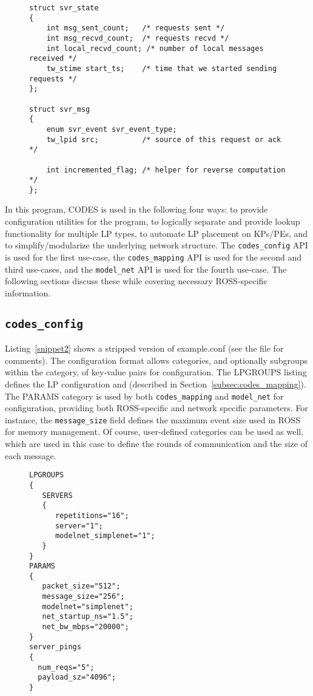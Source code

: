 \documentclass[conference,10pt,compsocconf,onecolumn]{IEEEtran}
\newcommand{\codesmapping}[1]{\texttt{codes\_mapping}}
\newcommand{\codesconfig}[1]{\texttt{codes\_config}}
\newcommand{\codesmodelnet}[1]{\texttt{model\_net}}
\begin{document}
\begin{figure}
\begin{lstlisting}[caption=Server state and event message struct, label=snippet1]
struct svr_state
{
    int msg_sent_count;   /* requests sent */
    int msg_recvd_count;  /* requests recvd */
    int local_recvd_count; /* number of local messages received */
    tw_stime start_ts;    /* time that we started sending requests */
};

struct svr_msg
{
    enum svr_event svr_event_type;
    tw_lpid src;          /* source of this request or ack */

    int incremented_flag; /* helper for reverse computation */
};

\end{lstlisting}
\end{figure}

In this program, CODES is used in the following four ways: to provide
configuration utilities for the program, to logically separate and provide
lookup functionality for multiple LP types, to automate LP placement on KPs/PEs,
and to simplify/modularize the underlying network structure. The \codesconfig{}
API is used for the first use-case, the \codesmapping{} API is used for
the second and third use-cases, and the \codesmodelnet{} API is used for the
fourth use-case. The following sections discuss these while covering necessary
ROSS-specific information.

\subsection{\codesconfig{}}

Listing~\ref{snippet2} shows a stripped version of example.conf (see the file
for comments). The configuration format allows categories, and optionally
subgroups within the category, of key-value pairs for configuration. The LPGROUPS
listing defines the LP configuration and (described in
Section~\ref{subsec:codes_mapping}). The PARAMS category is used by both
\codesmapping{} and \codesmodelnet{} for configuration, providing both ROSS-specific and
network specific parameters. For instance, the \texttt{message\_size} field defines the
maximum event size used in ROSS for memory management. Of course, user-defined
categories can be used as well, which are used in this case to define the rounds
of communication and the size of each message.

\begin{figure}
\begin{lstlisting}[caption=example configuration file for CODES LP mapping, label=snippet2]
LPGROUPS
{
   SERVERS
   {
      repetitions="16";
      server="1";
      modelnet_simplenet="1";
   }
}
PARAMS
{
   packet_size="512";
   message_size="256";
   modelnet="simplenet";
   net_startup_ns="1.5";
   net_bw_mbps="20000";
}
server_pings
{
  num_reqs="5";
  payload_sz="4096";
} 
\end{lstlisting}
\end{figure} 
\end{document}
